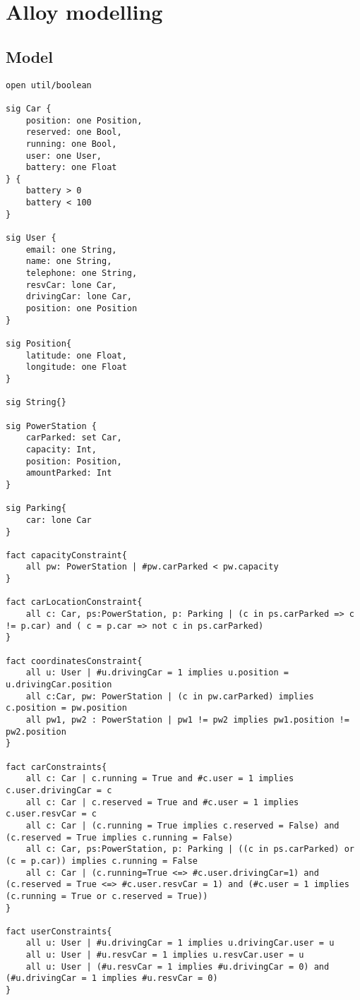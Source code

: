 \chapter{Alloy modelling}

\section{Model}
\begin{verbatim}
open util/boolean

sig Car {
	position: one Position,
	reserved: one Bool,
	running: one Bool,
	user: one User,
	battery: one Float
} {
	battery > 0
	battery < 100
}

sig User {
	email: one String,
	name: one String,
	telephone: one String,
	resvCar: lone Car,
	drivingCar: lone Car,
	position: one Position
}

sig Position{
	latitude: one Float,
	longitude: one Float
}

sig String{}

sig PowerStation {
	carParked: set Car,
	capacity: Int,
	position: Position,
	amountParked: Int
}

sig Parking{
	car: lone Car
}

fact capacityConstraint{
	all pw: PowerStation | #pw.carParked < pw.capacity
}

fact carLocationConstraint{
	all c: Car, ps:PowerStation, p: Parking | (c in ps.carParked => c != p.car) and ( c = p.car => not c in ps.carParked) 
}

fact coordinatesConstraint{
	all u: User | #u.drivingCar = 1 implies u.position = u.drivingCar.position
	all c:Car, pw: PowerStation | (c in pw.carParked) implies c.position = pw.position
	all pw1, pw2 : PowerStation | pw1 != pw2 implies pw1.position != pw2.position
}

fact carConstraints{
	all c: Car | c.running = True and #c.user = 1 implies c.user.drivingCar = c
	all c: Car | c.reserved = True and #c.user = 1 implies c.user.resvCar = c
	all c: Car | (c.running = True implies c.reserved = False) and (c.reserved = True implies c.running = False) 
	all c: Car, ps:PowerStation, p: Parking | ((c in ps.carParked) or (c = p.car)) implies c.running = False 
	all c: Car | (c.running=True <=> #c.user.drivingCar=1) and (c.reserved = True <=> #c.user.resvCar = 1) and (#c.user = 1 implies (c.running = True or c.reserved = True))
}

fact userConstraints{
	all u: User | #u.drivingCar = 1 implies u.drivingCar.user = u
	all u: User | #u.resvCar = 1 implies u.resvCar.user = u
	all u: User | (#u.resvCar = 1 implies #u.drivingCar = 0) and (#u.drivingCar = 1 implies #u.resvCar = 0)
}


\end{verbatim}
